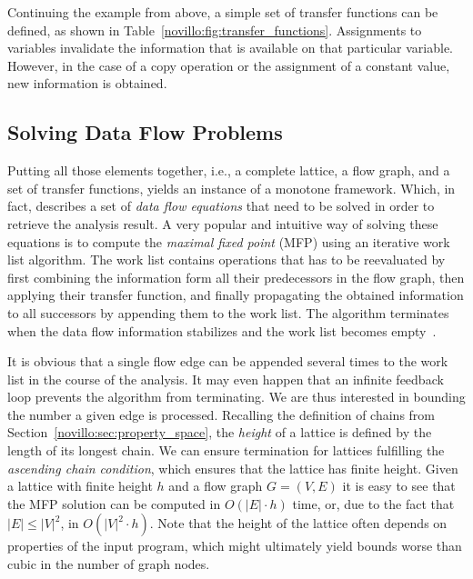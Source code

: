 Continuing the example from above, a simple set of transfer functions can be
defined, as shown in Table~\ref{novillo:fig:transfer_functions}. Assignments to
variables invalidate the information that is available on that particular
variable. However, in the case of a copy operation or the assignment of a
constant value, new information is obtained.

\subsection{Solving Data Flow Problems}

Putting all those elements together, i.e., a complete lattice, a flow graph, and
a set of transfer functions, yields an instance of a monotone framework. Which,
in fact, describes a set of \emph{data flow equations} that need to be solved in
order to retrieve the analysis result. A very popular and intuitive way of
solving these equations is to compute the \emph{maximal fixed point} (MFP) using
an iterative work list algorithm. The work list contains operations that has
to be reevaluated by first combining the information form all their predecessors
in the flow graph, then applying their transfer function, and finally
propagating the obtained information to all successors by appending them to the
work list. The algorithm terminates when the data flow information stabilizes
and the work list becomes empty~\cite{novillo:bib:NNH99}.

It is obvious that a single flow edge can be appended several times to the
work list in the course of the analysis. It may even happen that an infinite
feedback loop prevents the algorithm from terminating. We are thus interested in
bounding the number a given edge is processed. Recalling the definition of
chains from Section~\ref{novillo:sec:property_space}, the \emph{height} of a
lattice is defined by the length of its longest chain. We can ensure termination
for lattices fulfilling the \emph{ascending chain condition}, which ensures that
the lattice has finite height. Given a lattice with finite height $h$ and a flow
graph $G=(V, E)$ it is easy to see that the MFP solution can be computed in
$O(|E| \cdot h)$ time, or, due to the fact that $|E| \leq |V|^2$, in $O(|V|^2
\cdot h)$. Note that the height of the lattice often depends on properties of
the input program, which might ultimately yield bounds worse than cubic in the
number of graph nodes. 

